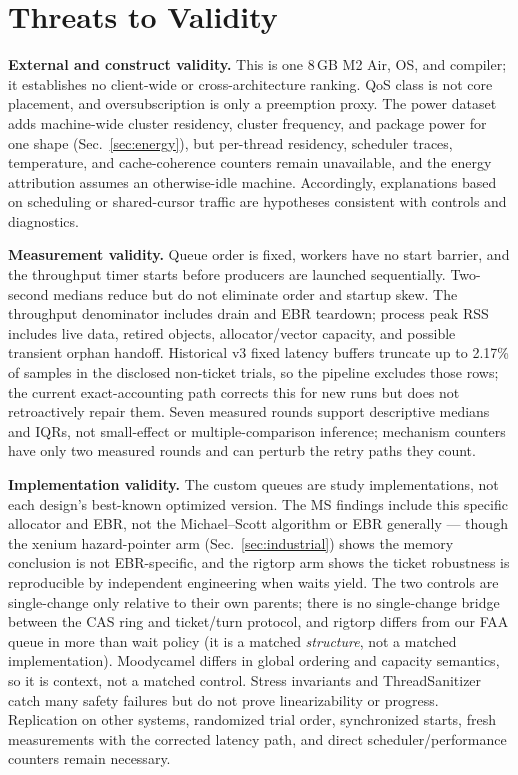 \documentclass[conference]{IEEEtran}
\begin{document}
\section{Threats to Validity}
\label{sec:threats}
\textbf{External and construct validity.} This is one 8\,GB M2 Air, OS, and
compiler; it establishes no client-wide or cross-architecture ranking. QoS
class is not core placement, and oversubscription is only a preemption proxy.
The power dataset adds machine-wide cluster residency, cluster frequency, and
package power for one shape (Sec.~\ref{sec:energy}), but per-thread
residency, scheduler traces, temperature, and cache-coherence counters remain
unavailable, and the energy attribution assumes an otherwise-idle machine.
Accordingly, explanations based on scheduling or shared-cursor traffic are
hypotheses consistent with controls and diagnostics.

\textbf{Measurement validity.} Queue order is fixed, workers have no start
barrier, and the throughput timer starts before producers are launched
sequentially. Two-second medians reduce but do not eliminate order and startup
skew. The throughput denominator includes drain and EBR teardown; process peak
RSS includes live data, retired objects, allocator/vector capacity, and possible
transient orphan handoff. Historical v3 fixed latency buffers truncate up to
2.17\% of samples in the disclosed non-ticket trials, so the pipeline excludes
those rows; the current exact-accounting path corrects this for new runs but
does not retroactively repair them. Seven measured rounds support descriptive
medians and IQRs, not small-effect or multiple-comparison inference; mechanism
counters have only two measured rounds and can perturb the retry paths they
count.

\textbf{Implementation validity.} The custom queues are study implementations,
not each design's best-known optimized version. The MS findings include this
specific allocator and EBR, not the Michael--Scott algorithm or EBR generally
--- though the xenium hazard-pointer arm (Sec.~\ref{sec:industrial}) shows the
memory conclusion is not EBR-specific, and the rigtorp arm shows the ticket
robustness is reproducible by independent engineering when waits yield. The
two controls are single-change only relative to their own parents; there is
no single-change bridge between the CAS ring and ticket/turn protocol, and
rigtorp differs from our FAA queue in more than wait policy (it is a matched
\emph{structure}, not a matched implementation).
Moodycamel differs in global ordering and capacity semantics, so it is context,
not a matched control. Stress invariants and ThreadSanitizer catch many safety
failures but do not prove linearizability or progress. Replication on other
systems, randomized trial order, synchronized starts, fresh measurements with
the corrected latency path, and direct scheduler/performance counters remain
necessary.
\end{document}
